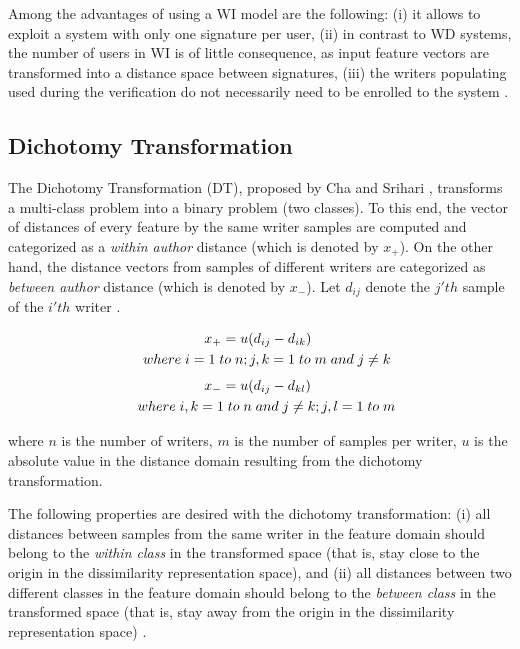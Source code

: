 \documentclass[conference]{IEEEtran}
\begin{document}
Among the advantages of using a WI model are the following: (i) it allows to exploit a system with only one signature per user, (ii) in contrast to WD systems, the number of users in WI is of little consequence, as input feature vectors are transformed into a distance space between signatures, (iii) the writers populating used during the verification do not necessarily need to be enrolled to the system \cite{rivard:13}.


\subsection{Dichotomy Transformation}


The Dichotomy Transformation (DT), proposed by Cha and Srihari \cite{cha:00}, transforms a multi-class problem into a binary problem (two classes). 
To this end, the vector of distances of every feature by the same writer samples are computed and categorized as a \textit{within author} distance (which is denoted by $x_+$). On the other hand, the distance vectors from samples of different writers are categorized as \textit{between author} distance (which is denoted by $x_-$). Let $d_{ij}$ denote the $j'th$ sample of the $i'th$ writer \cite{cha:00}.




\vspace{-0.5cm}
\begin{multline}
x_+ = u(d_{ij} - d_{ik}) \; \\ 
\shoveleft where \; i = 1 \; to \; n; j,k = 1 \; to \; m \; and \; j \neq k
\end{multline}
\vspace{-0.5cm}
\begin{multline}
x_- = u(d_{ij} - d_{kl}) \; \\
\shoveleft where \; i, k = 1 \; to \; n \;  and \; j \neq k; j,l = 1 \; to \; m
\end{multline}


\noindent where $n$ is the number of writers, $m$ is the number of samples per writer, $u$ is the absolute value in the distance domain resulting from the dichotomy transformation. 


The following properties are desired  with the dichotomy transformation: (i) all distances between samples from the same writer in the feature domain should belong to the \textit{within class} in the transformed space (that is, stay close to the origin in the dissimilarity representation space), and (ii) all distances between two different classes in the feature domain should belong to the \textit{between class} in the transformed space (that is, stay away from the origin in the dissimilarity representation space) \cite{cha:00}. 
\end{document}
